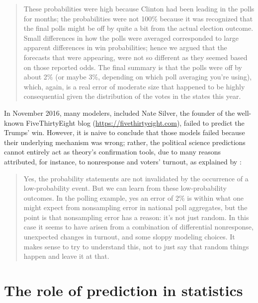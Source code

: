 \documentclass{statsoc}
\begin{document}
\begin{quote}
 These probabilities were high because Clinton had been leading in the polls for months; the probabilities were not 100\% because it was recognized that the final polls might be off by quite a bit from the actual election outcome. Small differences in how the polls were averaged corresponded to large apparent differences in win probabilities; hence we argued that the forecasts that were appearing, were not so different as they seemed based on those reported odds. The final summary is that the polls were off by about 2\% (or maybe 3\%, depending on which poll averaging you’re using), which, again, is a real error of moderate size that happened to be highly consequential given the distribution of the votes in the states this year.
\end{quote}
%
In November 2016, many modelers, included Nate Silver, the founder of the well-known FiveThirtyEight blog (\url{https://fivethirtyeight.com}), failed to predict the Trumps' win. However, it is naive to conclude that those models failed because their underlying mechanism was wrong; rather, the political science predictions cannot  entirely act as theory's confirmation tools, due to many reasons attributed, for instance, to nonresponse and voters' turnout, as explained by \cite{gelman2016elections2}:

\begin{quote}
Yes, the probability statements are not invalidated by the occurrence of a low-probability event. But we can learn from these low-probability outcomes. In the polling example, yes an error of 2\% is within what one might expect from nonsampling error in national poll aggregates, but the point is that nonsampling error has a reason: it’s not just random. In this case it seems to have arisen from a combination of differential nonresponse, unexpected changes in turnout, and some sloppy modeling choices. It makes sense to try to understand this, not to just say that random things happen and leave it at that.
\end{quote}

\section{The role of prediction in statistics}
\end{document}
